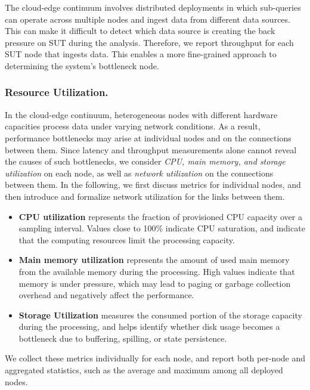 \documentclass[runningheads]{llncs}
\begin{document}
The cloud-edge continuum involves distributed deployments in which sub-queries can operate across multiple nodes and ingest data from different data sources. 
This can make it difficult to detect which data source is creating the back pressure on SUT during the analysis. 
Therefore, we report throughput for each SUT node that ingests data. 
This enables a more fine-grained approach to determining the system's bottleneck node. 

\subsubsection{Resource Utilization.}

In the cloud-edge continuum, heterogeneous nodes with different hardware capacities process data under varying network conditions.
As a result, performance bottlenecks may arise at individual nodes and on the connections between them.
Since latency and throughput measurements alone cannot reveal the causes of such bottlenecks, we consider \textit{CPU, main memory, and storage utilization} on each node, as well as \textit{network utilization} on the connections between them.
In the following, we first discuss metrics for individual nodes, and then introduce and formalize network utilization for the links between them.
\begin{itemize}
    \item \textbf{CPU utilization} represents the fraction of provisioned CPU capacity over a sampling interval.
Values close to 100\% indicate CPU saturation, and indicate that the computing resources limit the processing capacity.
    \item \textbf{Main memory utilization} represents the amount of used main memory from the available memory during the processing.
High values indicate that memory is under pressure, which may lead to paging or garbage collection overhead and negatively affect the performance.
    \item \textbf{Storage Utilization} measures the consumed portion of the storage capacity during the processing, and helps identify whether disk usage becomes a bottleneck due to buffering, spilling, or state persistence.
\end{itemize}
We collect these metrics individually for each node, and report both per-node and aggregated statistics, such as the average and maximum among all deployed nodes.
\end{document}
